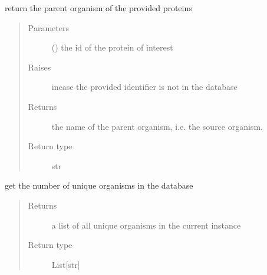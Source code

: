 \documentclass[letterpaper,10pt,english]{sphinxmanual}
\begin{document}
\begin{fulllineitems}
\begin{fulllineitems}
\label{\detokenize{IPTK.Classes:IPTK.Classes.Database.OrganismDB.get_org}}
return the parent organism of the provided proteins
\begin{quote}\begin{description}
\item[{Parameters}] \leavevmode
{} () \textendash{} the id of the protein of interest

\item[{Raises}] \leavevmode
{} \textendash{} incase the provided identifier is not in the database

\item[{Returns}] \leavevmode
the name of the parent organism, i.e. the source organism.

\item[{Return type}] \leavevmode
str

\end{description}\end{quote}

\end{fulllineitems}


\begin{fulllineitems}
\label{\detokenize{IPTK.Classes:IPTK.Classes.Database.OrganismDB.get_unique_orgs}}
get the number of unique organisms in the database
\begin{quote}\begin{description}
\item[{Returns}] \leavevmode
a list of all unique organisms in the current instance

\item[{Return type}] \leavevmode
List{[}str{]}

\end{description}\end{quote}

\end{fulllineitems}


\end{fulllineitems}
\end{document}
